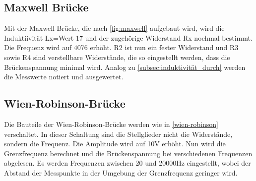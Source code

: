 \subsection{Maxwell Brücke}
\label{subsec:maxwell_durch}
Mit der Maxwell-Brücke, die nach \autoref{fig:maxwell} aufgebaut wird, wird die Induktiivität Lx=Wert 17 und der zugehörige Widerstand Rx nochmal bestimmt.
Die Frequenz wird auf 4076 erhöht. 
R2 ist nun ein fester Widerstand und R3 sowie R4 sind verstellbare Widerstände, die so eingestellt werden, dass die Brückenspannung minimal wird.
Analog zu \autoref{subsec:induktivität_durch} werden die Messwerte notiert und ausgewertet.

\subsection{Wien-Robinson-Brücke}
\label{subsec:wien-robinson_durch}
Die Bauteile der Wien-Robinson-Brücke werden wie in \autoref{wien-robinson} verschaltet.
In dieser Schaltung sind die Stellglieder nicht die Widerstände, sondern die Frequenz.
Die Amplitude wird auf 10V erhöht.
Nun wird die Grenzfrequenz berechnet und die Brückenspannung bei verschiedenen Frequenzen abgelesen.
Es werden Frequenzen zwischen 20 und 20000Hz eingestellt, wobei der Abstand der Messpunkte in der Umgebung der Grenzfrequenz geringer wird.